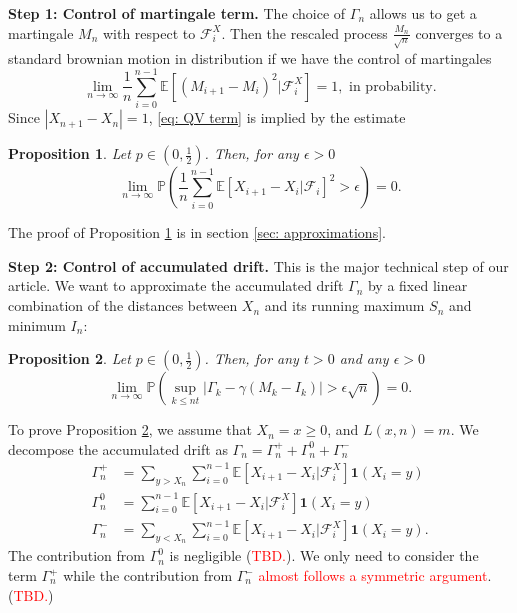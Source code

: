 \documentclass[twoside,12pt,a4paper]{article}
\newtheorem{proposition}{Proposition}[section]
\numberwithin{equation}{section}
\newcommand{\abs}[1]{\left\vert #1 \right\vert}
\newcommand\TBD{\textcolor{red}{TBD.}}
\begin{document}
\textbf{Step 1: Control of martingale term.}
The choice of $\Gamma_n$ allows us to get a martingale $M_n$ with respect to $\mathcal{F}_i^X.$ Then the rescaled process $\frac{M_n}{\sqrt{n}}$ converges to a standard brownian motion in distribution if we have the control of martingales 
\begin{equation}\label{eq: QV term}
\lim_{n\to \infty}\frac{1}{n} \sum_{i=0}^{n-1}\mathbb{E}\left[ (M_{i+1}- M_{i})^2 |\mathcal{F}_i^X \right] =1,  \mbox{ in probability}.
\end{equation}
Since $\abs{X_{n+1}-X_n}=1$,  \eqref{eq: QV term} is implied by the estimate
\begin{proposition} \label{lm: control of martingale} Let $p\in (0,\frac{1}{2})$. Then, for any $\epsilon >0$
	\begin{equation}\label{eq:  term}
	\lim_{n \to \infty }\mathbb{P}\left(\frac{1}{n} \sum_{i = 0}^{n-1} \mathbb{E}\left[ X_{i+1} - X_i | \mathcal{F}_i \right]^2 > \epsilon \right) =0. 
\end{equation}
\end{proposition}
The proof of Proposition \ref{lm: control of martingale} is in section \ref{sec: approximations}.

\textbf{Step 2: Control of accumulated drift.} This is the major technical step of our article. We want to approximate the accumulated drift $\Gamma_n$ by a fixed linear combination of the distances between $X_n$ and its running maximum $S_n$ and minimum $I_n$:
\begin{proposition}\label{lm: control of acc drift}
	 Let $p\in (0,\frac{1}{2})$. Then, for any $t>0$ and any $\epsilon >0$
	\begin{equation}\label{eq: control of acc drift}
		\lim_{n \to \infty }\mathbb{P}\left(\sup_{k\leq nt} \abs{\Gamma_k - \gamma \left(M_k - I_k \right)   } > \epsilon \sqrt{n}  \right) =0. 
	\end{equation}
\end{proposition}
To prove Proposition \ref{lm: control of acc drift}, we assume that $X_n=x \geq 0$, and $L(x,n)=m$. We decompose the accumulated drift as $\Gamma_n = 	\Gamma_n^+ +	\Gamma_n^0 + \Gamma_n^-$ 
\begin{align}
	\Gamma_n^+ &= \sum_{y > X_n} \sum_{i = 0}^{n-1} \mathbb{E}\left[ X_{i + 1} - X_i | \mathcal{F}_i^X \right] \mathbf{1}(X_i = y)\\
	\Gamma_n^0 &= \sum_{i = 0}^{n-1} \mathbb{E}\left[ X_{i + 1} - X_i | \mathcal{F}_i^X \right] \mathbf{1}(X_i = y) \\
	\Gamma_n^- &= \sum_{y < X_n} \sum_{i = 0}^{n-1} \mathbb{E}\left[ X_{i + 1} - X_i | \mathcal{F}_i^X \right] \mathbf{1}(X_i = y)
.\end{align} 
The contribution from $\Gamma_n^0$ is negligible (\TBD). We only need to consider the term $\Gamma_n^+$ while the contribution from $\Gamma_n^-$ \textcolor{red}{almost follows a symmetric argument}. (\TBD) 
\end{document}
